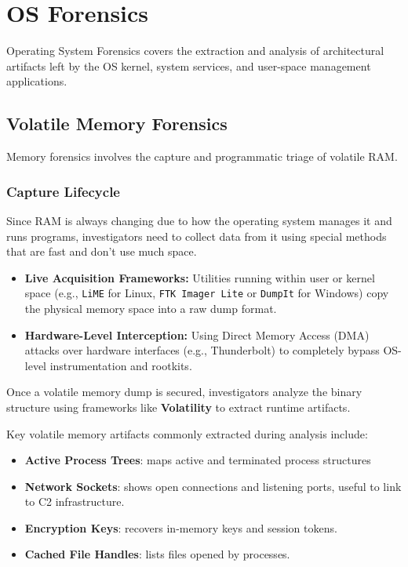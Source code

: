 \section{OS Forensics}

Operating System Forensics covers the extraction and analysis of architectural artifacts left by the OS kernel, system services, and user-space management applications.

\subsection{Volatile Memory Forensics}

Memory forensics involves the capture and programmatic triage of volatile RAM. 

\subsubsection*{Capture Lifecycle}
Since RAM is always changing due to how the operating system manages it and runs programs, investigators need to collect data from it using special methods that are fast and don't use much space.

\begin{itemize}
    \item \textbf{Live Acquisition Frameworks:} Utilities running within user or kernel space (e.g., \texttt{LiME} for Linux, \texttt{FTK Imager Lite} or \texttt{DumpIt} for Windows) copy the physical memory space into a raw dump format.
    \item \textbf{Hardware-Level Interception:} Using Direct Memory Access (DMA) attacks over hardware interfaces (e.g., Thunderbolt) to completely bypass OS-level instrumentation and rootkits.
\end{itemize}

\noindent
Once a volatile memory dump is secured, investigators analyze the binary structure using frameworks like \textbf{Volatility} to extract runtime artifacts.
\medskip

\noindent 
Key volatile memory artifacts commonly extracted during analysis include:
\begin{itemize}
    \item \textbf{Active Process Trees}: maps active and terminated process structures
    \item \textbf{Network Sockets}: shows open connections and listening ports, useful to link to C2 infrastructure.
    \item \textbf{Encryption Keys}: recovers in-memory keys and session tokens.
    \item \textbf{Cached File Handles}: lists files opened by processes.
\end{itemize}

